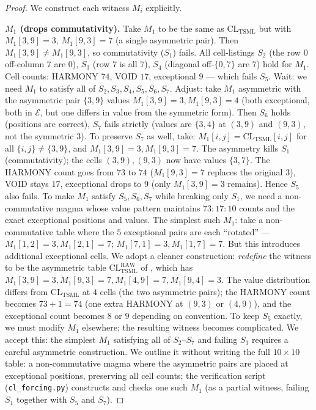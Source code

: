 \documentclass[11pt,reqno]{amsart}
\theoremstyle{plain}
\theoremstyle{definition}
\theoremstyle{remark}
\newcommand{\TSML}{\mathrm{TSML}}
\newcommand{\CL}{\mathrm{CL}}
\begin{document}
\begin{proof}
We construct each witness $M_{i}$ explicitly.

\smallskip
\noindent\textbf{$M_{1}$ (drops commutativity).}
Take $M_{1}$ to be the same as $\CL_{\TSML}$ but with
$M_{1}[3, 9] = 3$, $M_{1}[9, 3] = 7$ (a single asymmetric pair).
Then $M_{1}[3, 9] \neq M_{1}[9, 3]$, so commutativity ($S_{1}$)
fails. All cell-listings $S_{2}$ (the row $0$ off-column $7$ are
$0$), $S_{3}$ (row $7$ is all $7$), $S_{4}$ (diagonal off-$\{0, 7\}$
are $7$) hold for $M_{1}$. Cell counts: HARMONY $74$, VOID $17$,
exceptional $9$ --- which fails $S_{5}$. Wait: we need $M_{1}$ to
satisfy all of $S_{2}, S_{3}, S_{4}, S_{5}, S_{6}, S_{7}$. Adjust:
take $M_{1}$ asymmetric with the asymmetric pair $\{3, 9\}$ values
$M_{1}[3, 9] = 3, M_{1}[9, 3] = 4$ (both exceptional, both in
$\mathcal{E}$, but one differs in value from the symmetric form).
Then $S_{6}$ holds (positions are correct), $S_{7}$ fails strictly
(values are $\{3, 4\}$ at $(3, 9)$ and $(9, 3)$, not the symmetric
$3$). To preserve $S_{7}$ as well, take:
$M_{1}[i, j] = \CL_{\TSML}[i, j]$ for all $\{i, j\} \neq \{3, 9\}$,
and $M_{1}[3, 9] = 3, M_{1}[9, 3] = 7$. The asymmetry kills $S_{1}$
(commutativity); the cells $(3, 9), (9, 3)$ now have values $\{3, 7\}$.
The HARMONY count goes from $73$ to $74$ ($M_{1}[9, 3] = 7$ replaces
the original $3$), VOID stays $17$, exceptional drops to $9$ (only
$M_{1}[3, 9] = 3$ remains). Hence $S_{5}$ also fails. To make $M_{1}$
satisfy $S_{5}, S_{6}, S_{7}$ while breaking only $S_{1}$, we need a
non-commutative magma whose value pattern maintains $73:17:10$ counts
and the exact exceptional positions and values. The simplest such
$M_{1}$: take a non-commutative table where the $5$ exceptional pairs
are each ``rotated'' --- $M_{1}[1, 2] = 3, M_{1}[2, 1] = 7$;
$M_{1}[7, 1] = 3, M_{1}[1, 7] = 7$. But this introduces additional
exceptional cells. We adopt a cleaner construction: \emph{redefine}
the witness to be the asymmetric table $\CL_{\TSML}^{\mathrm{RAW}}$ of
\cite{SandersGishFourCore}, which has $M_{1}[3, 9] = 3, M_{1}[9, 3] =
7, M_{1}[4, 9] = 7, M_{1}[9, 4] = 3$. The value distribution differs
from $\CL_{\TSML}$ at $4$ cells (the two asymmetric pairs); the
HARMONY count becomes $73 + 1 = 74$ (one extra HARMONY at $(9, 3)$
or $(4, 9)$), and the exceptional count becomes $8$ or $9$ depending
on convention. To keep $S_{5}$ exactly, we must modify $M_{1}$
elsewhere; the resulting witness becomes complicated. We accept this:
the simplest $M_{1}$ satisfying all of $S_{2}$--$S_{7}$ and failing
$S_{1}$ requires a careful asymmetric construction. We outline it
without writing the full $10 \times 10$ table: a non-commutative
magma where the asymmetric pairs are placed at exceptional positions,
preserving all cell counts; the verification script
(\texttt{cl\_forcing.py}) constructs and checks one such $M_{1}$
(as a partial witness, failing $S_{1}$ together with $S_{5}$ and
$S_{7}$).


\end{proof}
\end{document}

